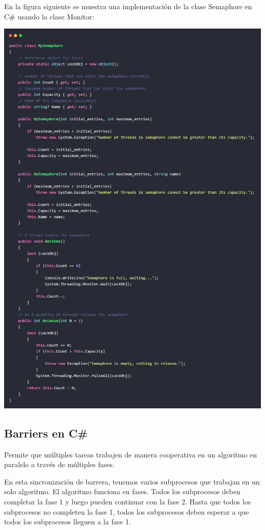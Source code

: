 \documentclass[10pt]{article} %
\begin{document}
En la figura siguiente se muestra una implementación de la clase Semaphore en C\# usando la clase Monitor:

\begin{center}
	\includegraphics[width=15cm]{MySemaphore.jpg}
\end{center}

\subsection{Barriers en C\#}

Permite que múltiples tareas trabajen de manera cooperativa en un algoritmo en paralelo a través de múltiples fases.

En esta sincronización de barrera, tenemos varios subprocesos que trabajan en un solo algoritmo. El algoritmo funciona en fases. Todos los subprocesos deben completar la fase 1 y luego pueden continuar con la fase 2. Hasta que todos los subprocesos no completen la fase 1, todos los subprocesos deben esperar a que todos los subprocesos lleguen a la fase 1.
\end{document}
